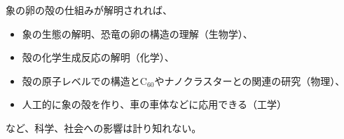 \documentclass[11pt,a4j,dvipdfmx]{jarticle} 					%
\newcommand{\研究課題名}{象の卵}
\newcommand{\研究機関名}{逢坂大学}
\newcommand{\研究代表者氏名}{湯川秀樹}
\newcommand{\研究期間の最終元号年度}{9}  %
\begin{document}
	象の卵の殻の仕組みが解明されれば、
	\begin{itemize}
		\item 象の生態の解明、恐竜の卵の構造の理解（生物学）、
		\item 殻の化学生成反応の解明（化学）、
		\item 殻の原子レベルでの構造とC$_{60}$やナノクラスターとの関連の研究（物理）、
		\item 人工的に象の殻を作り、車の車体などに応用できる（工学）
	\end{itemize}
	など、科学、社会への影響は計り知れない。	



\end{document}
